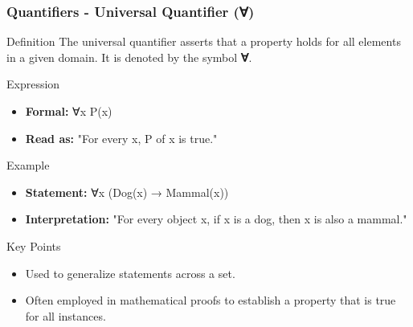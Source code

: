 \documentclass[aspectratio=169]{beamer}
\begin{document}
\begin{frame}[fragile]
    \frametitle{Quantifiers - Universal Quantifier (∀)}
    \begin{block}{Definition}
        The universal quantifier asserts that a property holds for all elements in a given domain. It is denoted by the symbol \textbf{∀}.
    \end{block}

    \begin{block}{Expression}
        \begin{itemize}
            \item \textbf{Formal:} ∀x P(x)
            \item \textbf{Read as:} "For every x, P of x is true."
        \end{itemize}
    \end{block}

    \begin{block}{Example}
        \begin{itemize}
            \item \textbf{Statement:} ∀x (Dog(x) → Mammal(x))
            \item \textbf{Interpretation:} "For every object x, if x is a dog, then x is also a mammal."
        \end{itemize}
    \end{block}

    \begin{block}{Key Points}
        \begin{itemize}
            \item Used to generalize statements across a set.
            \item Often employed in mathematical proofs to establish a property that is true for all instances.
        \end{itemize}
    \end{block}
\end{frame}
\end{document}
